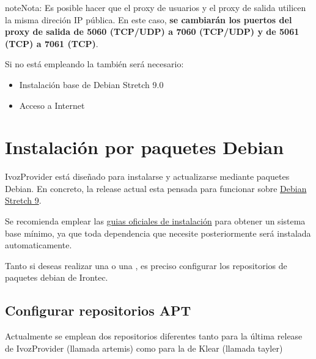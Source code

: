 \documentclass[letterpaper,10pt,spanish]{sphinxmanual}
\begin{document}
\begin{notice}{note}{Nota:}
Es posible hacer que el proxy de usuarios y el proxy de salida utilicen la misma direción IP pública. En este caso, \textbf{se cambiarán los puertos del proxy de salida de 5060 (TCP/UDP) a 7060 (TCP/UDP) y de 5061 (TCP) a 7061 (TCP)}.
\end{notice}

Si no está empleando la {\hyperref[basic_concepts/installation/cd_install:cds\string-automaticos\string-de\string-instalacion]{}} también será necesario:
\begin{itemize}
\item {} 
Instalación base de Debian Stretch 9.0

\item {} 
Acceso a Internet

\end{itemize}


\section{Instalación por paquetes Debian}
\label{basic_concepts/installation/debian_install::doc}\label{basic_concepts/installation/debian_install:debian-packages-install}
IvozProvider está diseñado para instalarse y actualizarse mediante paquetes Debian. En concreto, la release actual esta pensada para funcionar sobre \href{https://www.debian.org/releases/stretch}{Debian Stretch 9}.

Se recomienda emplear las \href{https://www.debian.org/releases/jessie/installmanual}{guias oficiales de instalación} para obtener un sistema base mínimo, ya que toda dependencia que necesite posteriormente será instalada automaticamente.

Tanto si deseas realizar una {\hyperref[basic_concepts/installation/install_types:instalacion\string-standalone]{}} o una {\hyperref[basic_concepts/installation/install_types:instalacion\string-distribuida]{}}, es preciso configurar los repositorios de paquetes debian de Irontec.


\subsection{Configurar repositorios APT}
\label{basic_concepts/installation/debian_install:apt-repository-configuration}
Actualmente se emplean dos repositorios diferentes tanto para la última release de IvozProvider (llamada artemis) como para la de Klear (llamada tayler)
\end{document}
